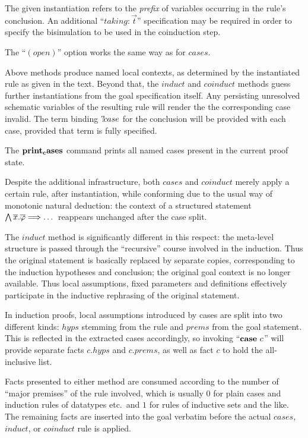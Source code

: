 \begin{descr}
  The given instantiation refers to the \emph{prefix} of variables occurring
  in the rule's conclusion.  An additional ``$taking: \vec t$'' specification
  may be required in order to specify the bisimulation to be used in the
  coinduction step.

  The ``$(open)$'' option works the same way as for $cases$.

\end{descr}

Above methods produce named local contexts, as determined by the instantiated
rule as given in the text.  Beyond that, the $induct$ and $coinduct$ methods
guess further instantiations from the goal specification itself.  Any
persisting unresolved schematic variables of the resulting rule will render
the the corresponding case invalid.  The term binding
${?\!case}$ for the conclusion will be provided with each
case, provided that term is fully specified.

The ${\mathord{\mathbf{print_cases}}}$ command prints all named cases present in the
current proof state.

\medskip

Despite the additional infrastructure, both $cases$ and $coinduct$ merely
apply a certain rule, after instantiation, while conforming due to the usual
way of monotonic natural deduction: the context of a structured statement
$\bigwedge\overline{x}. \overline{\varphi} \Longrightarrow \dots$ reappears unchanged after the case split.

The $induct$ method is significantly different in this respect: the meta-level
structure is passed through the ``recursive'' course involved in the
induction.  Thus the original statement is basically replaced by separate
copies, corresponding to the induction hypotheses and conclusion; the original
goal context is no longer available.  Thus local assumptions, fixed parameters
and definitions effectively participate in the inductive rephrasing of the
original statement.

In induction proofs, local assumptions introduced by cases are split into two
different kinds: $hyps$ stemming from the rule and $prems$ from the goal
statement.  This is reflected in the extracted cases accordingly, so invoking
``${\mathord{\mathbf{case}}}~c$'' will provide separate facts $c\mathord.hyps$ and
$c\mathord.prems$, as well as fact $c$ to hold the all-inclusive list.

\medskip

Facts presented to either method are consumed according to the number of
``major premises'' of the rule involved, which is usually $0$ for plain cases
and induction rules of datatypes etc.\ and $1$ for rules of inductive sets and
the like.  The remaining facts are inserted into the goal verbatim before the
actual $cases$, $induct$, or $coinduct$ rule is applied.


